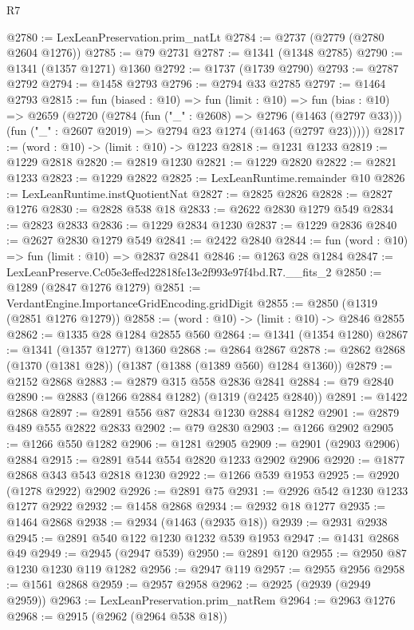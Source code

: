 \begin{lexlean}{R7}
\begin{coremodule}
@2780 := LexLeanPreservation.prim_natLt
@2784 := @2737 (@2779 (@2780 @2604 @1276))
@2785 := @79 @2731
@2787 := @1341 (@1348 @2785)
@2790 := @1341 (@1357 @1271) @1360
@2792 := @1737 (@1739 @2790)
@2793 := @2787 @2792
@2794 := @1458 @2793
@2796 := @2794 @33 @2785
@2797 := @1464 @2793
@2815 := fun (biased : @10) =>
  fun (limit : @10) =>
  fun (bias : @10) =>
  @2659
    (@2720
      (@2784
        (fun ("_" : @2608) => @2796 (@1463 (@2797 @33)))
        (fun ("_" : @2607 @2019) => @2794 @23 @1274 (@1463 (@2797 @23)))))
@2817 := (word : @10) -> (limit : @10) -> @1223
@2818 := @1231 @1233
@2819 := @1229 @2818
@2820 := @2819 @1230
@2821 := @1229 @2820
@2822 := @2821 @1233
@2823 := @1229 @2822
@2825 := LexLeanRuntime.remainder @10
@2826 := LexLeanRuntime.instQuotientNat
@2827 := @2825 @2826
@2828 := @2827 @1276
@2830 := @2828 @538 @18
@2833 := @2622 @2830 @1279 @549
@2834 := @2823 @2833
@2836 := @1229 @2834 @1230
@2837 := @1229 @2836
@2840 := @2627 @2830 @1279 @549
@2841 := @2422 @2840
@2844 := fun (word : @10) => fun (limit : @10) => @2837 @2841
@2846 := @1263 @28 @1284
@2847 := LexLeanPreserve.Cc05e3effed22818fe13e2f993e97f4bd.R7.__fits_2
@2850 := @1289 (@2847 @1276 @1279)
@2851 := VerdantEngine.ImportanceGridEncoding.gridDigit
@2855 := @2850 (@1319 (@2851 @1276 @1279))
@2858 := (word : @10) -> (limit : @10) -> @2846 @2855
@2862 := @1335 @28 @1284 @2855 @560
@2864 := @1341 (@1354 @1280)
@2867 := @1341 (@1357 @1277) @1360
@2868 := @2864 @2867
@2878 := @2862 @2868 (@1370 (@1381 @28)) (@1387 (@1388 (@1389 @560) @1284 @1360))
@2879 := @2152 @2868
@2883 := @2879 @315 @558 @2836 @2841
@2884 := @79 @2840
@2890 := @2883 (@1266 @2884 @1282) (@1319 (@2425 @2840))
@2891 := @1422 @2868
@2897 := @2891 @556 @87 @2834 @1230 @2884 @1282
@2901 := @2879 @489 @555 @2822 @2833
@2902 := @79 @2830
@2903 := @1266 @2902
@2905 := @1266 @550 @1282
@2906 := @1281 @2905
@2909 := @2901 (@2903 @2906) @2884
@2915 := @2891 @544 @554 @2820 @1233 @2902 @2906
@2920 := @1877 @2868 @343 @543 @2818 @1230
@2922 := @1266 @539 @1953
@2925 := @2920 (@1278 @2922) @2902
@2926 := @2891 @75
@2931 := @2926 @542 @1230 @1233 @1277 @2922
@2932 := @1458 @2868
@2934 := @2932 @18 @1277
@2935 := @1464 @2868
@2938 := @2934 (@1463 (@2935 @18))
@2939 := @2931 @2938
@2945 := @2891 @540 @122 @1230 @1232 @539 @1953
@2947 := @1431 @2868 @49
@2949 := @2945 (@2947 @539)
@2950 := @2891 @120
@2955 := @2950 @87 @1230 @1230 @119 @1282
@2956 := @2947 @119
@2957 := @2955 @2956
@2958 := @1561 @2868
@2959 := @2957 @2958
@2962 := @2925 (@2939 (@2949 @2959))
@2963 := LexLeanPreservation.prim_natRem
@2964 := @2963 @1276
@2968 := @2915 (@2962 (@2964 @538 @18))

\end{coremodule}
\end{lexlean}

